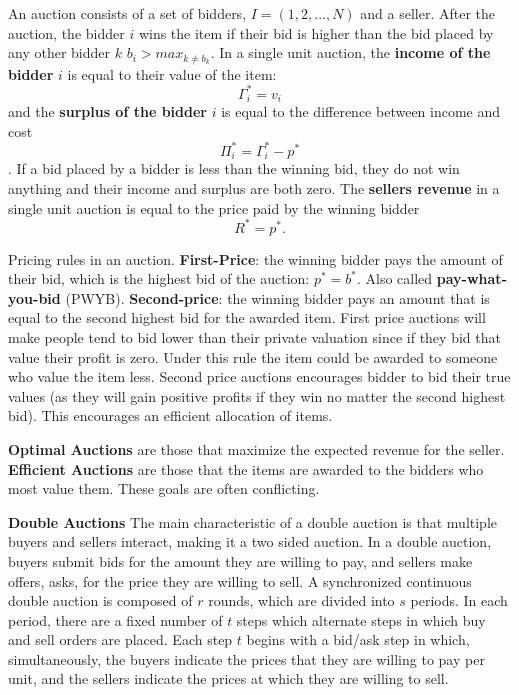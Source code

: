\documentclass[12pt,twoside]{reedthesis}
\begin{document}
An auction consists of a set of bidders, $I = (1,2, ...,N)$ and a seller. After the auction, the bidder $i$ wins the item if their bid is higher than the bid placed by any other bidder $k$ $b_i > max_{k \neq b_k}$. In a single unit auction, the \textbf{income of the bidder} $i$ is equal to their value of the item: $$ \Gamma_i^* = v_i$$ and the \textbf{surplus of the bidder} $i$ is equal to the difference between income and cost $$ \Pi_i^* = \Gamma_i^* - p^*$$. If a bid placed by a bidder is less than the winning bid, they do not win anything and their income and surplus are both zero. The \textbf{sellers revenue} in a single unit auction is equal to the price paid by the winning bidder $$ R^* = p^*.$$ 

Pricing rules in an auction. \textbf{First-Price}: the winning bidder pays the amount of their bid, which is the highest bid of the auction: $p^* = b^*$. Also called \textbf{pay-what-you-bid} (PWYB). \textbf{Second-price}: the winning bidder pays an amount that is equal to the second highest bid for the awarded item. First price auctions will make people tend to bid lower than their private valuation since if they bid that value their profit is zero. Under this rule the item could be awarded to someone who value the item less. Second price auctions encourages bidder to bid their true values (as they will gain positive profits if they win no matter the second highest bid). This encourages an efficient allocation of items.

\textbf{Optimal Auctions} are those that maximize the expected revenue for the seller.
\textbf{Efficient Auctions} are those that the items are awarded to the bidders who most value them.
These goals are often conflicting.

\textbf{Double Auctions} The main characteristic of a double auction is that multiple buyers and sellers interact, making it a two sided auction. In a double auction, buyers submit bids for the amount they are willing to pay, and sellers make offers, asks, for the price they are willing to sell. A synchronized continuous double auction is composed of $r$ rounds, which are divided into $s$ periods. In each period, there are a fixed number of $t$ steps which alternate steps in which buy and sell orders are placed. Each step $t$ begins with a bid/ask step in which, simultaneously, the buyers indicate the prices that they are willing to pay per unit, and the sellers indicate the prices at which they are willing to sell. \\
 
\end{document}
